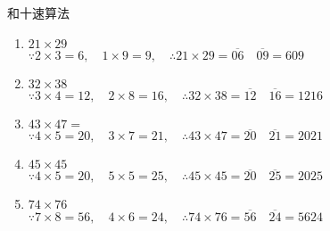 \documentclass[aspectratio=169]{ctexbeamer} %
\begin{document}
\begin{frame}[t]{和十速算法}
\begin{spacing}{1.2}
\normalsize
\begin{enumerate}[label={\arabic*.}]
\item $21 \times 29$ \\

$ \because 2 \times 3 = 6, \quad 1 \times 9 = 9, \quad \therefore 21 \times 29 = \overline{06} \quad \overline{09} = 609$
\item $32 \times 38$ \\

$ \because 3 \times 4 = 12, \quad 2 \times 8 = 16, \quad \therefore 32 \times 38 = \overline{12} \quad \overline{16} = 1216$
\item $43 \times 47 = $ \\

$ \because 4 \times 5 = 20, \quad 3 \times 7 = 21, \quad \therefore 43 \times 47 = \overline{20} \quad \overline{21} = 2021$
\item $45 \times 45$ \\

$ \because 4 \times 5 = 20, \quad 5 \times 5 = 25, \quad \therefore 45 \times 45 = \overline{20} \quad \overline{25} = 2025$
\item $74 \times 76$ \\

$ \because 7 \times 8 = 56, \quad 4 \times 6 = 24, \quad \therefore 74 \times 76 = \overline{56} \quad \overline{24} = 5624$
\end{enumerate}


\end{spacing}
\end{frame}
\end{document}
